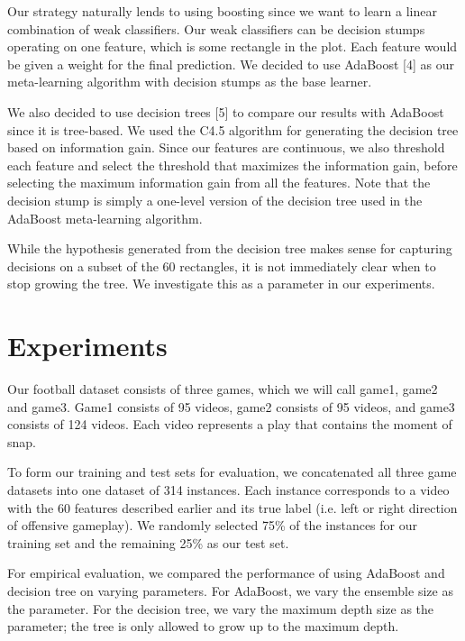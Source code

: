\documentclass{article} %
\begin{document}
Our strategy naturally lends to using boosting since we want to learn a linear combination of weak classifiers. Our weak classifiers can be decision stumps operating on one feature, which is some rectangle in the plot. Each feature would be given a weight for the final prediction. We decided to use AdaBoost [4] as our meta-learning algorithm with decision stumps as the base learner.

We also decided to use decision trees [5] to compare our results with AdaBoost since it is tree-based. We used the C4.5 algorithm for generating the decision tree based on information gain. Since our features are continuous, we also threshold each feature and select the threshold that maximizes the information gain, before selecting the maximum information gain from all the features. Note that the decision stump is simply a one-level version of the decision tree used in the AdaBoost meta-learning algorithm.

While the hypothesis generated from the decision tree makes sense for capturing decisions on a subset of the 60 rectangles, it is not immediately clear when to stop growing the tree. We investigate this as a parameter in our experiments.

\section{Experiments}

Our football dataset consists of three games, which we will call game1, game2 and game3. Game1 consists of 95 videos, game2 consists of 95 videos, and game3 consists of 124 videos. Each video represents a play that contains the moment of snap.

To form our training and test sets for evaluation, we concatenated all three game datasets into one dataset of 314 instances. Each instance corresponds to a video with the 60 features described earlier and its true label (i.e. left or right direction of offensive gameplay). We randomly selected 75\% of the instances for our training set and the remaining 25\% as our test set.

For empirical evaluation, we compared the performance of using AdaBoost and decision tree on varying parameters. For AdaBoost, we vary the ensemble size as the parameter. For the decision tree, we vary the maximum depth size as the parameter; the tree is only allowed to grow up to the maximum depth.
\end{document}
